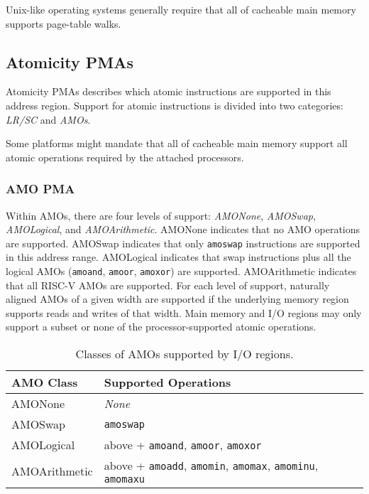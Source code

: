 \begin{commentary}
Unix-like operating systems generally require that all of cacheable main
memory supports page-table walks.
\end{commentary}

\subsection{Atomicity PMAs}

Atomicity PMAs describes which atomic instructions are supported in
this address region.
Support for atomic instructions is divided into two
categories: {\em LR/SC} and {\em AMOs}.

\begin{commentary}
Some platforms might mandate that all of cacheable main memory support
all atomic operations required by the attached processors.
\end{commentary}

\subsubsection{AMO PMA}

  Within AMOs, there are four levels of
support: {\em AMONone}, {\em AMOSwap}, {\em AMOLogical}, and {\em
  AMOArithmetic}.  AMONone indicates that no AMO operations are
supported.  AMOSwap indicates that only {\tt amoswap} instructions are
supported in this address range.  AMOLogical indicates that swap
instructions plus all the logical AMOs ({\tt amoand}, {\tt amoor},
{\tt amoxor}) are supported.  AMOArithmetic indicates that all RISC-V
AMOs are supported.  For each level of support, naturally aligned AMOs
of a given width are supported if the underlying memory region
supports reads and writes of that width.
Main memory and I/O regions may only support a subset or none of the
processor-supported atomic operations.

\begin{table*}[h!]
\begin{center}
\begin{tabular}{|l|l|}
  \hline
  AMO Class & Supported Operations \\
  \hline
  AMONone       & {\em None} \\
  AMOSwap       & {\tt amoswap} \\
  AMOLogical    & above + {\tt amoand}, {\tt amoor}, {\tt amoxor} \\
  AMOArithmetic & above + {\tt amoadd}, {\tt amomin}, {\tt amomax}, {\tt amominu}, {\tt amomaxu} \\
  \hline
\end{tabular}
\end{center}
\caption{Classes of AMOs supported by I/O regions.}
\label{amoclasses}
\end{table*}

